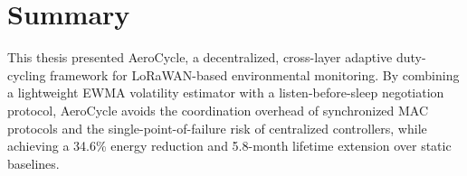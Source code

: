 \section{Summary}
This thesis presented AeroCycle, a decentralized, cross-layer adaptive duty-cycling framework
for LoRaWAN-based environmental monitoring. By combining a lightweight EWMA volatility
estimator with a listen-before-sleep negotiation protocol, AeroCycle avoids the coordination
overhead of synchronized MAC protocols and the single-point-of-failure risk of centralized
controllers, while achieving a 34.6\% energy reduction and 5.8-month lifetime extension over
static baselines.
